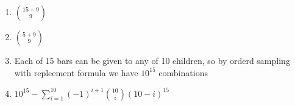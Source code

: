 \begin{enumerate}[label=(\alph*)]
\item $\binom{15+9}{9}$

\item $\binom{5+9}{9}$

\item 
Each of 15 bars can be given to any of 10 children, so by orderd sampling with replcement
formula we have $10^{15}$ combinations

\item $10^{15} - \sum_{i=1}^{10}\left(-1\right)^{i+1}\binom{10}{i}\left(10-i\right)^{15}$
\end{enumerate}
